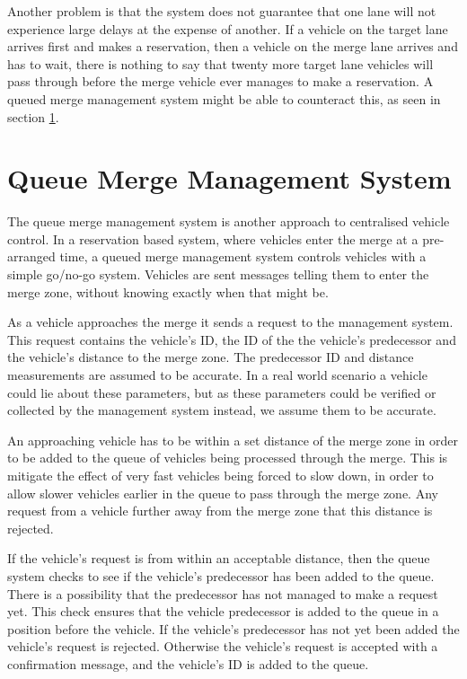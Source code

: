 Another problem is that the system does not guarantee that one lane will not experience large delays at the expense of another. If a vehicle on the target lane arrives first and makes a reservation, then a vehicle on the merge lane arrives and has to wait, there is nothing to say that twenty more target lane vehicles will pass through before the merge vehicle ever manages to make a reservation. A queued merge management system might be able to counteract this, as seen in section \ref{sec:Queue Merge Management System}.

\section{Queue Merge Management System}
\label{sec:Queue Merge Management System}
The queue merge management system is another approach to centralised vehicle control. In a reservation based system, where vehicles enter the merge at a pre-arranged time, a queued merge management system controls vehicles with a simple go/no-go system. Vehicles are sent messages telling them to enter the merge zone, without knowing exactly when that might be.

As a vehicle approaches the merge it sends a request to the management system. This request contains the vehicle's ID, the ID of the the vehicle's predecessor and the vehicle's distance to the merge zone. The predecessor ID and distance measurements are assumed to be accurate. In a real world scenario a vehicle could lie about these parameters, but as these parameters could be verified or collected by the management system instead, we assume them to be accurate.

An approaching vehicle has to be within a set distance of the merge zone in order to be added to the queue of vehicles being processed through the merge. This is mitigate the effect of very fast vehicles being forced to slow down, in order to allow slower vehicles earlier in the queue to pass through the merge zone. Any request from a vehicle further away from the merge zone that this distance is rejected.

If the vehicle's request is from within an acceptable distance, then the queue system checks to see if the vehicle's predecessor has been added to the queue. There is a possibility that the predecessor has not managed to make a request yet. This check ensures that the vehicle predecessor is added to the queue in a position before the vehicle. If the vehicle's predecessor has not yet been added the vehicle's request is rejected. Otherwise the vehicle's request is accepted with a confirmation message, and the vehicle's ID is added to the queue.

